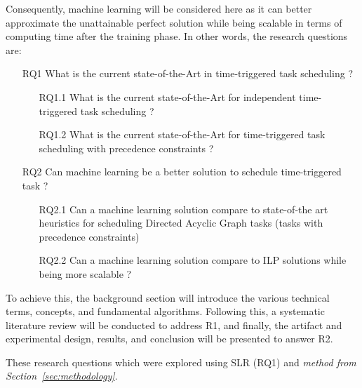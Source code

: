 Consequently, machine learning will be considered here as it can 
better approximate the unattainable perfect solution while being 
scalable in terms of computing time after the training phase. In 
other words, the research questions are:

\begin{itemize}
    \item [RQ1] What is the current state-of-the-Art in time-triggered task scheduling ?
            \begin{itemize}
                \item [RQ1.1] What is the current state-of-the-Art for independent time-triggered task scheduling ?
                \item [RQ1.2] What is the current state-of-the-Art for time-triggered task scheduling with precedence constraints ?
            \end{itemize}
    \item [RQ2]  Can machine learning be a better solution to schedule time-triggered task ?
            \begin{itemize}
                \item [RQ2.1] Can a machine learning solution compare to state-of-the art heuristics for scheduling Directed Acyclic Graph tasks (tasks with precedence constraints)
                \item [RQ2.2] Can a machine learning solution compare to ILP solutions while being more scalable ?
            \end{itemize}    
\end{itemize}

To achieve this, the background section will introduce the various 
technical terms, concepts, and fundamental algorithms. 
Following this, a systematic literature review will be conducted to address R1, 
and finally, the artifact and experimental design, results, and conclusion will 
be presented to answer R2.



These research questions which were explored using SLR (RQ1) and \textit{method from Section~\ref{sec:methodology}}.


